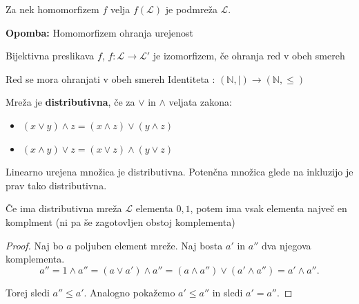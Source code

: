 \documentclass[slovene]{beamer}
\newenvironment{remark}
{\textbf{Opomba:}}
{}
\begin{document}
\begin{frame}
\begin{theorem}
Za nek homomorfizem $f$ velja $f(\mathcal{L})$ je podmreža $\mathcal{L}$.
\end{theorem}

\begin{remark}
Homomorfizem ohranja urejenost
\end{remark}
\end{frame}


\begin{frame}

\begin{theorem}
Bijektivna preslikava $f$, $f : \mathcal{L} \to \mathcal{L}'$ je izomorfizem, če ohranja red v obeh smereh
\end{theorem}

\begin{block}{Red se mora ohranjati v obeh smereh}
Identiteta : $(\mathbb{N}, |)  \to (\mathbb{N}, \leq) $
\end{block}
\end{frame}

\begin{frame}
\begin{definition}
Mreža je \textbf{distributivna}, če za $\lor$ in $\land$ veljata zakona:
\begin{itemize}
\item $(x \lor y) \land z = (x \land z) \lor (y \land z)$
\item $(x \land y) \lor z = (x \lor z) \land (y \lor z)$
\end{itemize}
\end{definition}


\begin{example}
Linearno urejena množica je distributivna.
Potenčna množica glede na inkluzijo je prav tako distributivna.
\end{example}

\end{frame}

\begin{frame}
\begin{theorem}
Če ima distributivna mreža $\mathcal{L}$ elementa $0,1$, potem ima vsak elementa največ en komplment (ni pa še zagotovljen obstoj komplementa)
\end{theorem}

\begin{proof}
Naj bo $a$ poljuben element mreže. Naj bosta $a'$ in $a''$ dva njegova komplementa.\\
$$ a'' = 1 \land a'' = (a \lor a') \land a'' = (a  \land a'') \lor (a' \land a'') =  a' \land a''. $$

Torej sledi $ a'' \leq a'$. Analogno pokažemo $a' \leq a''$ in sledi $ a' = a''.$

\end{proof}

\end{frame}
\end{document}
